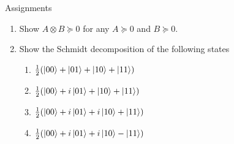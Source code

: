 \documentclass[10pt]{beamer}
\begin{document}
\begin{frame}{Assignments}
\begin{enumerate}
\setlength{\itemsep}{2em}
\item Show $A\otimes B \succeq 0$ for any $A\succeq 0$ and $B\succeq 0$.
\item Show the Schmidt decomposition of the following states
\begin{enumerate}[A]
\setlength{\itemsep}{1em}
\item $\frac12(\ket{00}+\ket{01}+\ket{10}+\ket{11})$
\item $\frac12(\ket{00}+i\ket{01}+\ket{10}+\ket{11})$
\item $\frac12(\ket{00}+i\ket{01}+i\ket{10}+\ket{11})$
\item $\frac12(\ket{00}+i\ket{01}+i\ket{10}-\ket{11})$
\end{enumerate}
\end{enumerate}
\end{frame}
\end{document}
